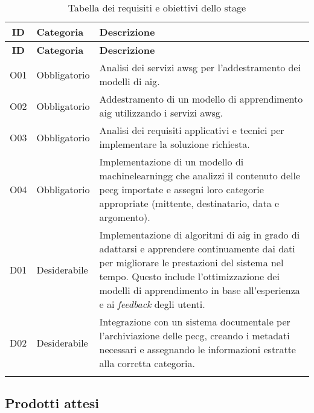 \begin{longtable}{|c|p{4cm}|p{10cm}|}
    \hline
    \textbf{ID}  & \textbf{Categoria}                                               & \textbf{Descrizione}                                       \\
    \hline
    \endfirsthead

    \hline
    \textbf{ID}  & \textbf{Categoria}                                               & \textbf{Descrizione}                                       \\
    \hline
    \endhead

    O01          & Obbligatorio                                                     & Analisi dei servizi \gls{awsg} per l'addestramento dei modelli di \gls{aig}. \\
    \hline 
    O02          & Obbligatorio                                                     & Addestramento di un modello di apprendimento \gls{aig} utilizzando i servizi \gls{awsg}. \\
    \hline 
    O03          & Obbligatorio                                                     & Analisi dei requisiti applicativi e tecnici per implementare la soluzione richiesta. \\
    \hline 
    O04          & Obbligatorio                                                     & Implementazione di un modello di \gls{machinelearningg} che analizzi il contenuto delle \gls{pecg} importate e assegni loro categorie appropriate (mittente, destinatario, data e argomento). \\
    \hline 
    D01          & Desiderabile                                                     & Implementazione di algoritmi di \gls{aig} in grado di adattarsi e apprendere continuamente dai dati per migliorare le prestazioni del sistema nel tempo. Questo include l'ottimizzazione dei modelli di apprendimento in base all'esperienza e ai \emph{feedback} degli utenti. \\
    \hline 
    D02          & Desiderabile                                                     & Integrazione con un sistema documentale per l'archiviazione delle \gls{pecg}, creando i metadati necessari e assegnando le informazioni estratte alla corretta categoria. \\
    \hline
    \caption{Tabella dei requisiti e obiettivi dello stage} \\
\end{longtable}

\subsection{Prodotti attesi}

